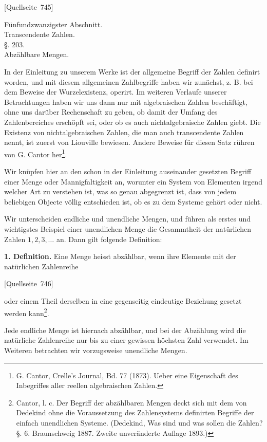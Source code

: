 \documentclass[11pt]{article}
\newcommand{\srcpage}[1]{\par\medskip\noindent\textsf{[Quellseite~#1]}\par\smallskip}
\begin{document}
\srcpage{745}
\begin{center}
{\large Fünfundzwanzigster Abschnitt.}\\[0.8em]
{\Large Transcendente Zahlen.}\\[1.2em]
{\large §. 203.}\\[0.4em]
{\large Abzählbare Mengen.}
\end{center}

In der Einleitung zu unserem Werke ist der allgemeine Begriff der Zahlen definirt worden, und mit diesem allgemeinen Zahlbegriffe haben wir zunächst, z. B. bei dem Beweise der Wurzelexistenz, operirt. Im weiteren Verlaufe unserer Betrachtungen haben wir uns dann nur mit algebraischen Zahlen beschäftigt, ohne uns darüber Rechenschaft zu geben, ob damit der Umfang des Zahlenbereiches erschöpft sei, oder ob es auch nichtalgebraische Zahlen giebt. Die Existenz von nichtalgebraischen Zahlen, die man auch transcendente Zahlen nennt, ist zuerst von Liouville bewiesen. Andere Beweise für diesen Satz rühren von G. Cantor her\footnote{G. Cantor, Crelle's Journal, Bd. 77 (1873). Ueber eine Eigenschaft des Inbegriffes aller reellen algebraischen Zahlen.}.

Wir knüpfen hier an den schon in der Einleitung auseinander gesetzten Begriff einer Menge oder Mannigfaltigkeit an, worunter ein System von Elementen irgend welcher Art zu verstehen ist, was so genau abgegrenzt ist, dass von jedem beliebigen Objecte völlig entschieden ist, ob es zu dem Systeme gehört oder nicht.

Wir unterscheiden endliche und unendliche Mengen, und führen als erstes und wichtigstes Beispiel einer unendlichen Menge die Gesammtheit der natürlichen Zahlen $1,2,3,\ldots$ an. Dann gilt folgende Definition:

\textbf{1. Definition.} Eine Menge heisst abzählbar, wenn ihre Elemente mit der natürlichen Zahlenreihe
\srcpage{746}
oder einem Theil derselben in eine gegenseitig eindeutige Beziehung gesetzt werden kann\footnote{Cantor, l. c. Der Begriff der abzählbaren Mengen deckt sich mit dem von Dedekind ohne die Voraussetzung des Zahlensystems definirten Begriffe der einfach unendlichen Systeme. (Dedekind, Was sind und was sollen die Zahlen? §. 6. Braunschweig 1887. Zweite unveränderte Auflage 1893.)}.

Jede endliche Menge ist hiernach abzählbar, und bei der Abzählung wird die natürliche Zahlenreihe nur bis zu einer gewissen höchsten Zahl verwendet. Im Weiteren betrachten wir vorzugsweise unendliche Mengen.
\end{document}
